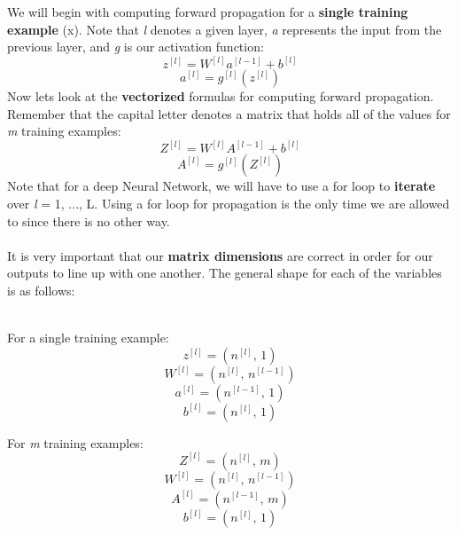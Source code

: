 \documentclass[11pt, a4paper]{article}
\begin{document}
\begin{spacing}{1.1}
	\noindent We will begin with computing forward propagation for a \textbf{single training example} (x). Note that \textit{l} denotes a given layer, \textit{a} represents the input from the previous layer, and \textit{g} is our activation function:
	$$ z^{[l]} = W^{[l]}a^{[l-1]}+b^{[l]}$$ $$ a^{[l]} = g^{[l]}(z^{[l]})$$ 
	Now lets look at the \textbf{vectorized} formulas for computing forward propagation. Remember that the capital letter denotes a matrix that holds all of the values for \textit{m} training examples: 
	$$ Z^{[l]} = W^{[l]}A^{[l-1]}+b^{[l]}$$ $$ A^{[l]} = g^{[l]}(Z^{[l]})$$ 
	Note that for a deep Neural Network, we will have to use a for loop to \textbf{iterate} over \textit{l} = 1, ..., L. Using a for loop for propagation is the only time we are allowed to since there is no other way. \\~\\
	It is very important that our \textbf{matrix dimensions} are correct in order for our outputs to line up with one another. The general shape for each of the variables is as follows: \\~\\
	\begin{minipage}[c]{8cm}
	\hspace*{13mm} For a single training example: $$ z^{[l]} = (n^{[l]},\, 1) $$ $$ W^{[l]} = (n^{[l]},\, n^{[l-1]}) $$ $$ a^{[l]} = (n^{[l-1]},\, 1) $$ $$ b^{[l]} = (n^{[l]},\, 1) $$
	\end{minipage}
	\begin{minipage}[c]{8cm}
	\hspace*{18mm} For \textit{m} training examples: $$ Z^{[l]} = (n^{[l]},\, m) $$ $$ W^{[l]} = (n^{[l]},\, n^{[l-1]}) $$ $$ A^{[l]} = (n^{[l-1]},\, m) $$ $$ b^{[l]} = (n^{[l]},\, 1) $$
	\end{minipage} \\

\end{spacing}
\end{document}
